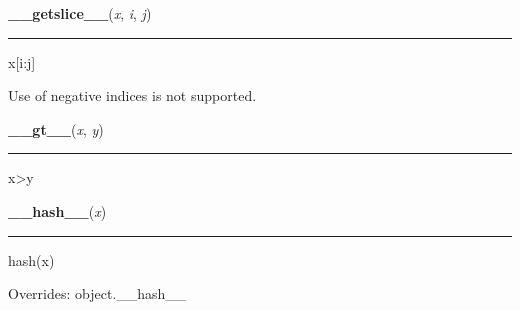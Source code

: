     \label{posix:statvfs_result:__getslice__}

    \vspace{0.5ex}

\hspace{.8\funcindent}\begin{boxedminipage}{\funcwidth}

    \raggedright \textbf{\_\_getslice\_\_}(\textit{x}, \textit{i}, \textit{j})

    \vspace{-1.5ex}

    \rule{\textwidth}{0.5\fboxrule}
\setlength{\parskip}{2ex}
    x[i:j]

    Use of negative indices is not supported.

\setlength{\parskip}{1ex}
    \end{boxedminipage}

    \label{posix:statvfs_result:__gt__}

    \vspace{0.5ex}

\hspace{.8\funcindent}\begin{boxedminipage}{\funcwidth}

    \raggedright \textbf{\_\_gt\_\_}(\textit{x}, \textit{y})

    \vspace{-1.5ex}

    \rule{\textwidth}{0.5\fboxrule}
\setlength{\parskip}{2ex}
    x{\textgreater}y

\setlength{\parskip}{1ex}
    \end{boxedminipage}

    \vspace{0.5ex}

\hspace{.8\funcindent}\begin{boxedminipage}{\funcwidth}

    \raggedright \textbf{\_\_hash\_\_}(\textit{x})

    \vspace{-1.5ex}

    \rule{\textwidth}{0.5\fboxrule}
\setlength{\parskip}{2ex}
    hash(x)

\setlength{\parskip}{1ex}
      Overrides: object.\_\_hash\_\_

    \end{boxedminipage}

